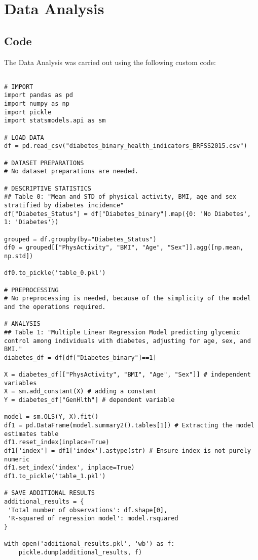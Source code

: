 \documentclass[11pt]{article}
\begin{document}
\section{Data Analysis} \subsection{Code}The Data Analysis was carried out using the following custom code:

\begin{verbatim}

# IMPORT
import pandas as pd
import numpy as np
import pickle
import statsmodels.api as sm

# LOAD DATA
df = pd.read_csv("diabetes_binary_health_indicators_BRFSS2015.csv")

# DATASET PREPARATIONS
# No dataset preparations are needed.

# DESCRIPTIVE STATISTICS
## Table 0: "Mean and STD of physical activity, BMI, age and sex stratified by diabetes incidence"
df["Diabetes_Status"] = df["Diabetes_binary"].map({0: 'No Diabetes', 1: 'Diabetes'})

grouped = df.groupby(by="Diabetes_Status")
df0 = grouped[["PhysActivity", "BMI", "Age", "Sex"]].agg([np.mean, np.std])

df0.to_pickle('table_0.pkl')

# PREPROCESSING 
# No preprocessing is needed, because of the simplicity of the model and the operations required.

# ANALYSIS
## Table 1: "Multiple Linear Regression Model predicting glycemic control among individuals with diabetes, adjusting for age, sex, and BMI."
diabetes_df = df[df["Diabetes_binary"]==1]

X = diabetes_df[["PhysActivity", "BMI", "Age", "Sex"]] # independent variables
X = sm.add_constant(X) # adding a constant
Y = diabetes_df["GenHlth"] # dependent variable

model = sm.OLS(Y, X).fit()
df1 = pd.DataFrame(model.summary2().tables[1]) # Extracting the model estimates table
df1.reset_index(inplace=True)
df1['index'] = df1['index'].astype(str) # Ensure index is not purely numeric
df1.set_index('index', inplace=True)
df1.to_pickle('table_1.pkl')

# SAVE ADDITIONAL RESULTS
additional_results = {
 'Total number of observations': df.shape[0], 
 'R-squared of regression model': model.rsquared
}

with open('additional_results.pkl', 'wb') as f:
    pickle.dump(additional_results, f)

\end{verbatim}
\end{document}
